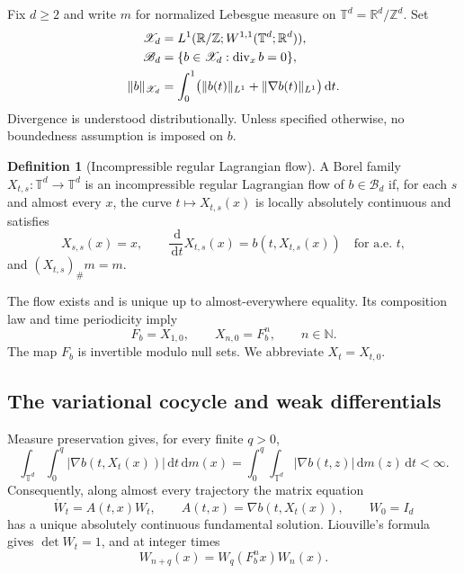 \documentclass[review,12pt,times,a4paper,nopreprintline]{elsarticle}
\theoremstyle{plain}
\theoremstyle{definition}
\newtheorem{definition}[theorem]{Definition}
\theoremstyle{remark}
\newcommand{\T}{\mathbb T}
\newcommand{\R}{\mathbb R}
\newcommand{\N}{\mathbb N}
\newcommand{\Z}{\mathbb Z}
\newcommand{\B}{\mathscr B}
\newcommand{\X}{\mathscr X}
\newcommand{\dd}{\,\mathrm d}
\newcommand{\diver}{\operatorname{div}}
\numberwithin{equation}{section}
\begin{document}
Fix $d\geq2$ and write $m$ for normalized Lebesgue measure on $\T^d=\R^d/\Z^d$. Set
\begin{align}
 \X_d&=L^1(\R/\Z;W^{1,1}(\T^d;\R^d)),\label{eq:space}\\
 \B_d&=\{b\in\X_d:\diver_xb=0\},\label{eq:class}\\
 \|b\|_{\X_d}&=\int_0^1\bigl(\|b(t)\|_{L^1}+\|\nabla b(t)\|_{L^1}\bigr)\dd t.\notag
\end{align}
Divergence is understood distributionally. Unless specified otherwise, no boundedness assumption is imposed on $b$.

\begin{definition}[Incompressible regular Lagrangian flow]
A Borel family $X_{t,s}:\T^d\to\T^d$ is an incompressible regular Lagrangian flow of $b\in\B_d$ if, for each $s$ and almost every $x$, the curve $t\mapsto X_{t,s}(x)$ is locally absolutely continuous and satisfies
\[
 X_{s,s}(x)=x,\qquad
 \frac{\dd}{\dd t}X_{t,s}(x)=b(t,X_{t,s}(x))\quad\text{for a.e. }t,
\]
and $(X_{t,s})_\#m=m$.
\end{definition}
The flow exists and is unique up to almost-everywhere equality. Its composition law and time periodicity imply
\begin{equation}\label{eq:timeone}
 F_b=X_{1,0},\qquad X_{n,0}=F_b^n,\qquad n\in\N.
\end{equation}
The map $F_b$ is invertible modulo null sets. We abbreviate $X_t=X_{t,0}$.

\subsection{The variational cocycle and weak differentials}
Measure preservation gives, for every finite $q>0$,
\begin{equation}\label{eq:fubiniA}
 \int_{\T^d}\int_0^q|\nabla b(t,X_t(x))|\dd t\dd m(x)
 =\int_0^q\int_{\T^d}|\nabla b(t,z)|\dd m(z)\dd t<\infty.
\end{equation}
Consequently, along almost every trajectory the matrix equation
\begin{equation}\label{eq:variational}
 \dot W_t=A(t,x)W_t,\qquad
 A(t,x)=\nabla b(t,X_t(x)),\qquad W_0=I_d
\end{equation}
has a unique absolutely continuous fundamental solution. Liouville's formula gives $\det W_t=1$, and at integer times
\begin{equation}\label{eq:cocycle}
 W_{n+q}(x)=W_q(F_b^nx)W_n(x).
\end{equation}
\end{document}
